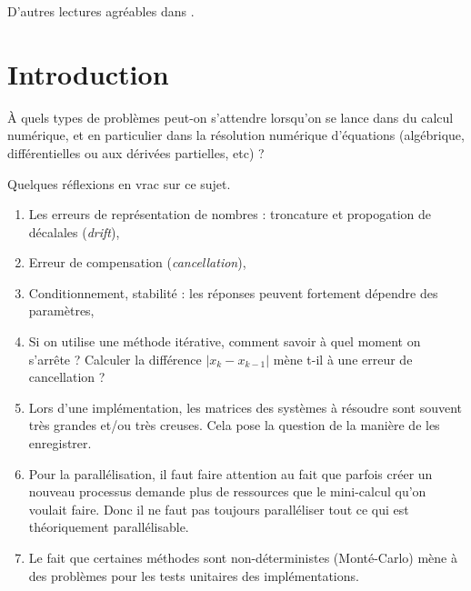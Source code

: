 
D'autres lectures agréables dans \cite{GianlucaB}.

\section{Introduction}

À quels types de problèmes peut-on s'attendre lorsqu'on se lance dans du calcul numérique, et en particulier dans la résolution numérique d'équations (algébrique, différentielles ou aux dérivées partielles, etc) ?

Quelques réflexions en vrac sur ce sujet.

\begin{enumerate}
	\item
	      Les erreurs de représentation de nombres : troncature et propogation de décalales (\emph{drift}),
	\item
	      Erreur de compensation (\emph{cancellation}),
	\item
	      Conditionnement, stabilité : les réponses peuvent fortement dépendre des paramètres,
	\item
	      Si on utilise une méthode itérative, comment savoir à quel moment on s'arrête ? Calculer la différence \( | x_k-x_{k-1} |\) mène t-il à une erreur de cancellation ?
	\item
	      Lors d'une implémentation, les matrices des systèmes à résoudre sont souvent très grandes et/ou très creuses. Cela pose la question de la manière de les enregistrer.
	\item
	      Pour la parallélisation, il faut faire attention au fait que parfois créer un nouveau processus demande plus de ressources que le mini-calcul qu'on voulait faire. Donc il ne faut pas toujours paralléliser tout ce qui est théoriquement parallélisable.
	\item
	      Le fait que certaines méthodes sont non-déterministes (Monté-Carlo) mène à des problèmes pour les tests unitaires des implémentations.
\end{enumerate}

